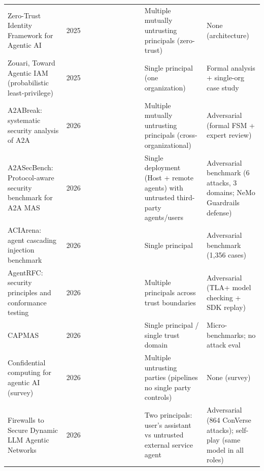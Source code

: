 \documentclass[conference]{IEEEtran}
\newcommand{\full}{{\small\CIRCLE}}
\newcommand{\half}{{\small\LEFTcircle}}
\newcommand{\none}{{\small\Circle}}
\begin{document}
{\begin{longtable}{>{\raggedright\arraybackslash}p{4.2cm} c cccccccc >{\raggedright\arraybackslash}p{3.6cm} >{\raggedright\arraybackslash}p{4.4cm}}
Zero-Trust Identity Framework for Agentic AI \cite{huang2025zerotrust} & 2025 & \half{} & \half{} & \none{} & \half{} & \none{} & \none{} & \half{} & \half{} & Multiple mutually untrusting principals (zero-trust) & None (architecture) \\
Zouari, Toward Agentic IAM (probabilistic least-privilege) \cite{zouari2025agentic} & 2025 & \none{} & \none{} & \none{} & \half{} & \none{} & \none{} & \none{} & \none{} & Single principal (one organization) & Formal analysis + single-org case study \\
A2ABreak: systematic security analysis of A2A \cite{lotfi2026a2abreak} & 2026 & \none{} & \half{} & \none{} & \half{} & \none{} & \none{} & \none{} & \full{} & Multiple mutually untrusting principals (cross-organizational) & Adversarial (formal FSM + expert review) \\
A2ASecBench: Protocol-aware security benchmark for A2A MAS \cite{li2026a2asecbench} & 2026 & \none{} & \half{} & \none{} & \none{} & \none{} & \none{} & \none{} & \full{} & Single deployment (Host + remote agents) with untrusted third-party agents/users & Adversarial benchmark (6 attacks, 3 domains; NeMo Guardrails defense) \\
ACIArena: agent cascading injection benchmark \cite{an2026aciarena} & 2026 & \none{} & \none{} & \none{} & \none{} & \none{} & \none{} & \none{} & \full{} & Single principal & Adversarial benchmark (1,356 cases) \\
AgentRFC: security principles and conformance testing \cite{zheng2026agentrfc} & 2026 & \none{} & \none{} & \none{} & \half{} & \none{} & \half{} & \half{} & \full{} & Multiple principals across trust boundaries & Adversarial (TLA+ model checking + SDK replay) \\
CAPMAS \cite{veski2026capmas} & 2026 & \none{} & \none{} & \none{} & \full{} & \none{} & \none{} & \full{} & \half{} & Single principal / single trust domain & Micro-benchmarks; no attack eval \\
Confidential computing for agentic AI (survey) \cite{forough2026confidential} & 2026 & \none{} & \half{} & \none{} & \none{} & \none{} & \none{} & \none{} & \half{} & Multiple untrusting parties (pipelines no single party controls) & None (survey) \\
Firewalls to Secure Dynamic LLM Agentic Networks \cite{abdelnabi2026firewalls} & 2026 & \none{} & \none{} & \none{} & \half{} & \none{} & \none{} & \none{} & \full{} & Two principals: user's assistant vs untrusted external service agent & Adversarial (864 ConVerse attacks); self-play (same model in all roles) \\

\end{longtable}}
\end{document}
